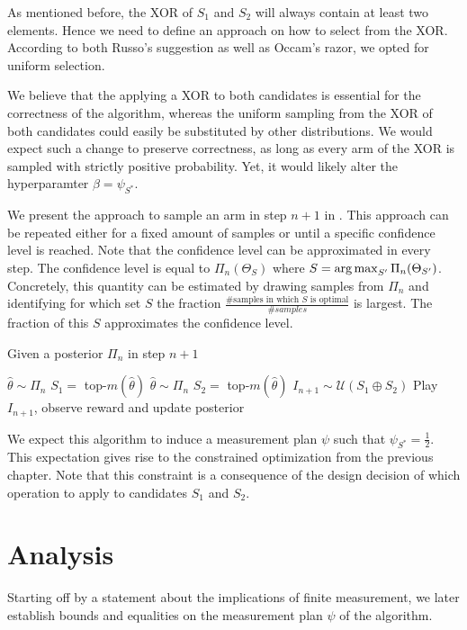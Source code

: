 As mentioned before, the XOR of $S_1$ and $S_2$ will always contain at least two elements. Hence we need to define an approach on how to select from the XOR. According to both Russo's suggestion as well as Occam's razor, we opted for uniform selection.

We believe that the applying a XOR to both candidates is essential for the correctness of the algorithm, whereas the uniform sampling from the XOR of both candidates could easily be substituted by other distributions. We would expect such a change to preserve correctness, as long as every arm of the XOR is sampled with strictly positive probability. Yet, it would likely alter the hyperparamter $\beta = \psi_{S^*}$.

We present the approach to sample an arm in step $n + 1$ in . This approach can be repeated either for a fixed amount of samples or until a specific confidence level is reached. Note that the confidence level can be approximated in every step. The confidence level is equal to $\Pi_n(\Theta_S)$ where $S = \operatorname*{arg\,max}_{S'} \Pi_n(\Theta_{S'})$. Concretely, this quantity can be estimated by drawing samples from $\Pi_n$ and identifying for which set $S$ the fraction $\frac{\text{\# samples in which $S$ is optimal}}{\#samples}$ is largest. The fraction of this $S$ approximates the confidence level.
\begin{algorithm}[H]
  \caption{Given a posterior $\Pi_n$ in step $n+1$}
  \label{alg:TXTS}
  \begin{algorithmic}
    \State $\hat{\theta} \sim \Pi_n$
    \State $S_1 =$ top-$m(\hat{\theta})$
    \Repeat
      \State $\hat{\theta} \sim \Pi_n$
      \State $S_2 = $ top-$m(\hat{\theta})$
    \State $I_{n+1} \sim \mathcal{U}(S_1 \oplus S_2)$
    \State Play $I_{n+1}$, observe reward and update posterior
  \end{algorithmic}
\end{algorithm}
We expect this algorithm to induce a measurement plan $\psi$ such that $\psi_{S^*} = \frac{1}{2}$. This expectation gives rise to the constrained optimization from the previous chapter. Note that this constraint is a consequence of the design decision of which operation to apply to candidates $S_1$ and $S_2$.

\section{Analysis}\label{section:analysis}
Starting off by a statement about the implications of finite measurement, we later establish bounds and equalities on the measurement plan $\psi$ of the algorithm.

